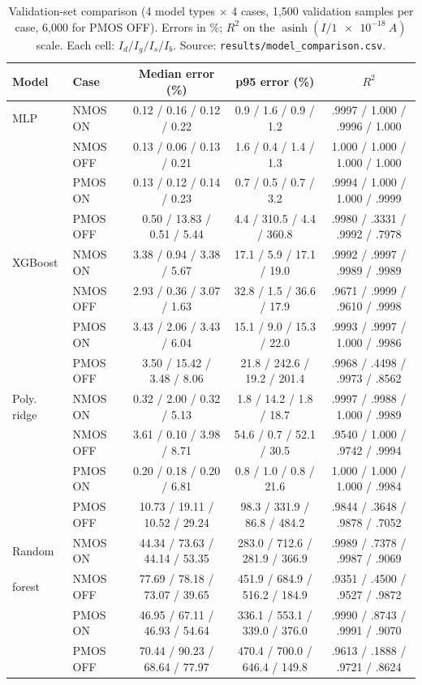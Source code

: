 \documentclass[11pt,a4paper]{article}
\begin{document}
\begin{table}[!htbp]
\centering
\footnotesize
\caption{Validation-set comparison (4 model types $\times$ 4 cases, 1{,}500 validation samples per
case, 6{,}000 for PMOS OFF). Errors in \%; $R^2$ on the $\operatorname{asinh}(I/\SI{1e-18}{A})$ scale. Each cell:
$I_d / I_g / I_s / I_b$. Source: \texttt{results/model\_comparison.csv}.}
\label{tab:cmp}
\setlength{\tabcolsep}{2.5pt}
\begin{tabular}{llccc}
\toprule
Model & Case & Median error (\%) & p95 error (\%) & $R^2$ \\
\midrule
MLP         & NMOS ON  & 0.12 / 0.16 / 0.12 / 0.22 & 0.9 / 1.6 / 0.9 / 1.2 & .9997 / 1.000 / .9996 / 1.000 \\
            & NMOS OFF & 0.13 / 0.06 / 0.13 / 0.21 & 1.6 / 0.4 / 1.4 / 1.3 & 1.000 / 1.000 / 1.000 / 1.000 \\
            & PMOS ON  & 0.13 / 0.12 / 0.14 / 0.23 & 0.7 / 0.5 / 0.7 / 3.2 & .9994 / 1.000 / 1.000 / .9999 \\
            & PMOS OFF & 0.50 / 13.83 / 0.51 / 5.44 & 4.4 / 310.5 / 4.4 / 360.8 & .9980 / .3331 / .9992 / .7978 \\
\midrule
XGBoost     & NMOS ON  & 3.38 / 0.94 / 3.38 / 5.67 & 17.1 / 5.9 / 17.1 / 19.0 & .9992 / .9997 / .9989 / .9989 \\
            & NMOS OFF & 2.93 / 0.36 / 3.07 / 1.63 & 32.8 / 1.5 / 36.6 / 17.9 & .9671 / .9999 / .9610 / .9998 \\
            & PMOS ON  & 3.43 / 2.06 / 3.43 / 6.04 & 15.1 / 9.0 / 15.3 / 22.0 & .9993 / .9997 / 1.000 / .9986 \\
            & PMOS OFF & 3.50 / 15.42 / 3.48 / 8.06 & 21.8 / 242.6 / 19.2 / 201.4 & .9968 / .4498 / .9973 / .8562 \\
\midrule
Poly. ridge & NMOS ON  & 0.32 / 2.00 / 0.32 / 5.13 & 1.8 / 14.2 / 1.8 / 18.7 & .9997 / .9988 / 1.000 / .9989 \\
            & NMOS OFF & 3.61 / 0.10 / 3.98 / 8.71 & 54.6 / 0.7 / 52.1 / 30.5 & .9540 / 1.000 / .9742 / .9994 \\
            & PMOS ON  & 0.20 / 0.18 / 0.20 / 6.81 & 0.8 / 1.0 / 0.8 / 21.6 & 1.000 / 1.000 / 1.000 / .9984 \\
            & PMOS OFF & 10.73 / 19.11 / 10.52 / 29.24 & 98.3 / 331.9 / 86.8 / 484.2 & .9844 / .3648 / .9878 / .7052 \\
\midrule
Random      & NMOS ON  & 44.34 / 73.63 / 44.14 / 53.35 & 283.0 / 712.6 / 281.9 / 366.9 & .9989 / .7378 / .9987 / .9069 \\
forest      & NMOS OFF & 77.69 / 78.18 / 73.07 / 39.65 & 451.9 / 684.9 / 516.2 / 184.9 & .9351 / .4500 / .9527 / .9872 \\
            & PMOS ON  & 46.95 / 67.11 / 46.93 / 54.64 & 336.1 / 553.1 / 339.0 / 376.0 & .9990 / .8743 / .9991 / .9070 \\
            & PMOS OFF & 70.44 / 90.23 / 68.64 / 77.97 & 470.4 / 700.0 / 646.4 / 149.8 & .9613 / .1888 / .9721 / .8624 \\
\bottomrule
\end{tabular}
\end{table}
\end{document}
